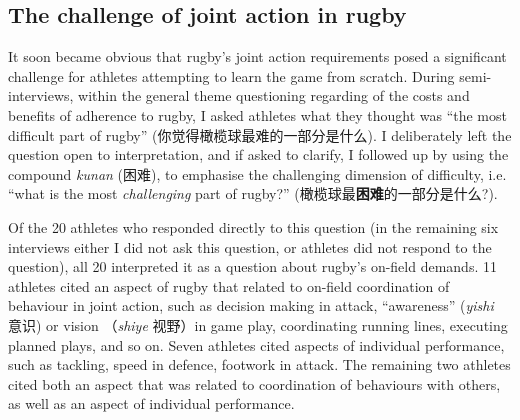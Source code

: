 \begin{CJK}{UTF8}{gbsn}


\subsection{The challenge of joint action in rugby}

It soon became obvious that rugby's joint action requirements posed a significant challenge for athletes attempting to learn the game from scratch.  During semi-interviews, within the general theme questioning regarding of the costs and benefits of adherence to rugby, I asked athletes what they thought was ``the most difficult part of rugby'' (你觉得橄榄球最难的一部分是什么).  I deliberately left the question open to interpretation, and if asked to clarify, I followed up by using the compound \textit{kunan} (困难), to emphasise the challenging dimension of difficulty, i.e. ``what is the most \textit{challenging} part of rugby?'' (橄榄球最\textbf{困难}的一部分是什么?).

Of the 20 athletes who responded directly to this question (in the remaining six interviews either I did not ask this question, or athletes did not respond to the question), all 20 interpreted it as a question about rugby's on-field demands.  11 athletes cited an aspect of rugby that related to on-field coordination of behaviour in joint action, such as decision making in attack, ``awareness'' (\textit{yishi} 意识) or vision （\textit{shiye} 视野）in game play, coordinating running lines, executing planned plays, and so on.  Seven athletes cited aspects of individual performance, such as tackling, speed in defence, footwork in attack. The remaining two athletes cited both an aspect that was related to coordination of behaviours with others, as well as an aspect of individual performance.


\end{CJK}
